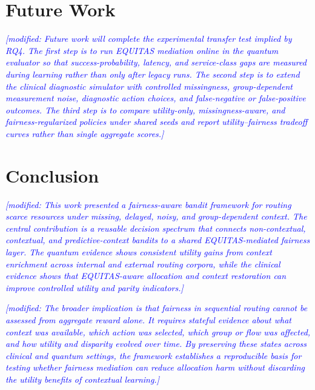 \documentclass[conference]{IEEEtran}
\newcommand{\modified}[1]{\textcolor{blue}{{\it [modified: #1]}}}
\begin{document}
\section{Future Work}
\modified{Future work will complete the experimental transfer test implied by
RQ4. The first step is to run EQUITAS mediation online in the quantum evaluator
so that success-probability, latency, and service-class gaps are measured during
learning rather than only after legacy runs. The second step is to extend the
clinical diagnostic simulator with controlled missingness, group-dependent
measurement noise, diagnostic action choices, and false-negative or
false-positive outcomes. The third step is to compare utility-only,
missingness-aware, and fairness-regularized policies under shared seeds and
report utility--fairness tradeoff curves rather than single aggregate scores.}

\section{Conclusion}
\modified{This work presented a fairness-aware bandit framework for routing
scarce resources under missing, delayed, noisy, and group-dependent context.
The central contribution is a reusable decision spectrum that connects
non-contextual, contextual, and predictive-context bandits to a shared
EQUITAS-mediated fairness layer. The quantum evidence shows consistent utility
gains from context enrichment across internal and external routing corpora,
while the clinical evidence shows that EQUITAS-aware allocation and context
restoration can improve controlled utility and parity indicators.}

\modified{The broader implication is that fairness in sequential routing cannot
be assessed from aggregate reward alone. It requires stateful evidence about
what context was available, which action was selected, which group or flow was
affected, and how utility and disparity evolved over time. By preserving these
states across clinical and quantum settings, the framework establishes a
reproducible basis for testing whether fairness mediation can reduce allocation
harm without discarding the utility benefits of contextual learning.}






\clearpage
\appendices
\end{document}
